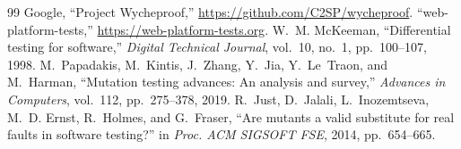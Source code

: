 \documentclass[conference]{IEEEtran}
\begin{document}
\begin{thebibliography}{99}
 Google, ``Project Wycheproof,'' \url{https://github.com/C2SP/wycheproof}.
 ``web-platform-tests,'' \url{https://web-platform-tests.org}.
 W.~M. McKeeman, ``Differential testing for software,'' \emph{Digital Technical Journal}, vol.~10, no.~1, pp.~100--107, 1998.
 M.~Papadakis, M.~Kintis, J.~Zhang, Y.~Jia, Y.~Le~Traon, and M.~Harman, ``Mutation testing advances: An analysis and survey,'' \emph{Advances in Computers}, vol.~112, pp.~275--378, 2019.
 R.~Just, D.~Jalali, L.~Inozemtseva, M.~D. Ernst, R.~Holmes, and G.~Fraser, ``Are mutants a valid substitute for real faults in software testing?'' in \emph{Proc. ACM SIGSOFT FSE}, 2014, pp.~654--665.
\end{thebibliography}
\end{document}
